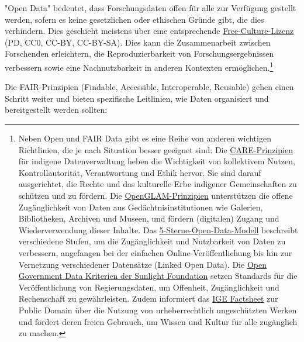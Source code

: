 \documentclass[
  nswissgerman,
  letterpaper,
  DIV=11,
  numbers=noendperiod]{scrartcl}
\begin{document}
"Open Data" bedeutet, dass Forschungsdaten offen für alle zur Verfügung
gestellt werden, sofern es keine gesetzlichen oder ethischen Gründe
gibt, die dies verhindern. Dies geschieht meistens über eine
entsprechende
\href{https://creativecommons.org/share-your-work/public-domain/freeworks/}{Free-Culture-Lizenz}
(PD, CC0, CC-BY, CC-BY-SA). Dies kann die Zusammenarbeit zwischen
Forschenden erleichtern, die Reproduzierbarkeit von
Forschungsergebnissen verbessern sowie eine Nachnutzbarkeit in anderen
Kontexten ermöglichen.\footnote{Neben Open und FAIR Data gibt es eine
  Reihe von anderen wichtigen Richtlinien, die je nach Situation besser
  geeignet sind: Die
  \href{https://www.gida-global.org/care}{CARE-Prinzipien} für indigene
  Datenverwaltung heben die Wichtigkeit von kollektivem Nutzen,
  Kontrollautorität, Verantwortung und Ethik hervor. Sie sind darauf
  ausgerichtet, die Rechte und das kulturelle Erbe indigener
  Gemeinschaften zu schützen und zu fördern. Die
  \href{https://openglam.org/principles/}{OpenGLAM-Prinzipien}
  unterstützen die offene Zugänglichkeit von Daten aus
  Gedächtnisinstitutionen wie Galerien, Bibliotheken, Archiven und
  Museen, und fördern (digitalen) Zugang und Wiederverwendung dieser
  Inhalte. Das
  \href{https://5stardata.info/de/}{5-Sterne-Open-Data-Modell}
  beschreibt verschiedene Stufen, um die Zugänglichkeit und Nutzbarkeit
  von Daten zu verbessern, angefangen bei der einfachen
  Online-Veröffentlichung bis hin zur Vernetzung verschiedener
  Datensätze (Linked Open Data). Die
  \href{https://sunlightfoundation.com/opendataguidelines/}{Open
  Government Data Kriterien der Sunlight Foundation} setzen Standards
  für die Veröffentlichung von Regierungsdaten, um Offenheit,
  Zugänglichkeit und Rechenschaft zu gewährleisten. Zudem informiert das
  \href{https://www.ige.ch/en/protecting-your-ip/copyright/using-a-work/public-domain}{IGE
  Factsheet} zur Public Domain über die Nutzung von urheberrechtlich
  ungeschützten Werken und fördert deren freien Gebrauch, um Wissen und
  Kultur für alle zugänglich zu machen.}

Die FAIR-Prinzipien (Findable, Accessible, Interoperable, Reusable)
gehen einen Schritt weiter und bieten spezifische Leitlinien, wie Daten
organisiert und bereitgestellt werden sollten:
\end{document}
